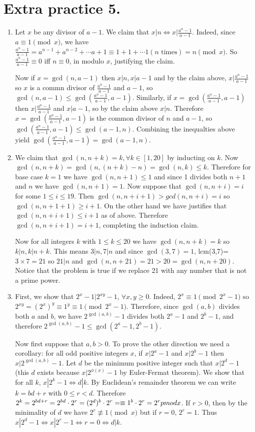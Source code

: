 \documentclass[11pt]{article}
\begin{document}
\section{Extra practice 5.}
\begin{enumerate}
\item Let $x$ be any divisor of $a-1$. We claim that $x|n\Leftrightarrow x|\frac{a^n-1}{a-1}$. Indeed, since $a\equiv 1\pmod {x}$, we have $\frac{a^n-1}{a-1}=a^{n-1}+a^{n-2}+\cdots a+1\equiv 1+1+\cdots 1 (\text {$n$ times})=n\pmod {x}$. So $\frac{a^n-1}{a-1}\equiv 0$ iff $n\equiv 0$, in modulo $x$, justifying the claim.

Now if $x=\gcd (n, a-1)$ then $x|n, x|a-1$ and by the claim above, $x|\frac{a^n-1}{a-1}$ so $x$ is a commn divisor of $\frac{a^n-1}{a-1}$ and $a-1$, so $\gcd (n, a-1)\le\gcd (\frac{a^n-1}{a-1}, a-1).$ Similarly, if $x=\gcd (\frac{a^n-1}{a-1}, a-1)$ then $x|\frac{a^n-1}{a-1}$ and $x|a-1$, so by the claim above $x|n$. Therefore $x=\gcd (\frac{a^n-1}{a-1}, a-1)$ is the common divisor of $n$ and $a-1$, so $\gcd (\frac{a^n-1}{a-1}, a-1)\le \gcd(a-1, n)$. Combining the inequalties above yield $\gcd (\frac{a^n-1}{a-1}, a-1)= \gcd(a-1, n)$.

\item We claim that $\gcd (n,n+k)=k, \forall k\in [1,20]$ by inducting on $k$. Now $\gcd (n,n+k)=\gcd(n, (n+k)-n)=\gcd(n,k)\le k$. Therefore for base case $k=1$ we have $\gcd (n,n+1)\le 1$ and since 1 divides both $n+1$ and $n$ we have $\gcd (n, n+1)=1$. Now suppose that $\gcd (n, n+i)=i$ for some $1\le i\le 19$. Then $\gcd (n,n+i+1)>gcd(n,n+i)=i$ so $\gcd (n,n+1+1)\ge i+1$. On the other hand we have justifies that $\gcd (n,n+i+1)\le i+1$ as of above. Therefore $\gcd (n, n+i+1)=i+1$, completing the induction claim.

Now for all integers $k$ with $1\le k\le 20$ we have $\gcd (n,n+k)=k$ so $k|n, k|n+k$. This means $3|n, 7|n$ and since $\gcd (3,7)=1$, lcm(3,7)=$3\times 7=21$ so $21|n$ and $\gcd (n, n+21)=21>20=\gcd (n, n+20)$. Notice that the problem is true if we replace 21 with any number that is not a prime power.

\item First, we show that $2^x-1|2^{xy}-1$, $\forall x, y\ge 0$. Indeed, $2^x\equiv 1\pmod {2^x-1}$ so $2^{xy}=(2^x)^{y}\equiv 1^y\equiv 1\pmod {2^x-1}$. Therefore, since $\gcd (a,b)$ divides both $a$ and $b$, we have $2^{\gcd(a,b)}-1$ divides both $2^a-1$ and $2^b-1$, and therefore $2^{\gcd (a,b)}-1\le \gcd (2^a-1, 2^b-1)$.

Now first suppose that $a,b>0$. To prove the other direction we need a corollary: for all odd positive integers $x$, if $x|2^a-1$ and $x|2^b-1$ then $x|2^{\gcd (a,b)}-1$. Let $d$ be the minimum positive integer such that $x|2^d-1$ (this $d$ exists because $x|2^{\phi (x)}-1$ by Euler-Fermat theorem). We show that for all $k$, $x|2^k-1\Leftrightarrow d|k$. By Euclidean's remainder theorem we can write $k=bd+r$ with $0\le r<d$. Therefore $2^k=2^{bd+r} = 2^{bd}\cdot 2^r = (2^d)^b\cdot 2^r = \equiv 1^b\cdot 2^r=2^r\\pmod {x}$. If $r>0$, then by the minimality of $d$ we have $2^r\not\equiv 1\pmod {x}$ but if $r=0$, $2^r=1$. Thus $x|2^d-1\Leftrightarrow x|2^r-1\Leftrightarrow r=0\Leftrightarrow d|k$.


\end{enumerate}
\end{document}
